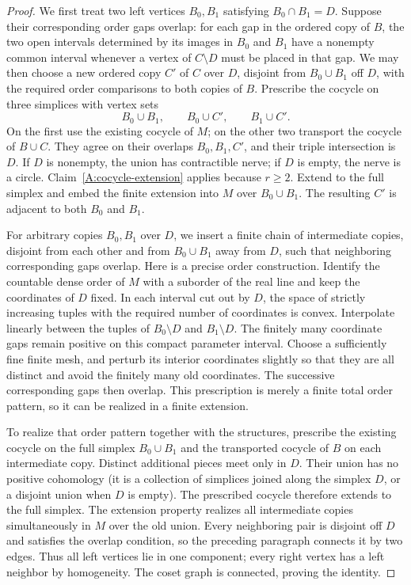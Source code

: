 \begin{proof}
We first treat two left vertices $B_0,B_1$ satisfying $B_0\cap B_1=D$. Suppose their corresponding order gaps overlap: for each gap in the ordered copy of $B$, the two open intervals determined by its images in $B_0$ and $B_1$ have a nonempty common interval whenever a vertex of $C\setminus D$ must be placed in that gap. We may then choose a new ordered copy $C'$ of $C$ over $D$, disjoint from $B_0\cup B_1$ off $D$, with the required order comparisons to both copies of $B$. Prescribe the cocycle on three simplices with vertex sets
\[
 B_0\cup B_1,\qquad B_0\cup C',\qquad B_1\cup C'.
\]
On the first use the existing cocycle of $M$; on the other two transport the cocycle of $B\cup C$. They agree on their overlaps $B_0,B_1,C'$, and their triple intersection is $D$. If $D$ is nonempty, the union has contractible nerve; if $D$ is empty, the nerve is a circle. Claim~\ref{A:cocycle-extension} applies because $r\geq2$. Extend to the full simplex and embed the finite extension into $M$ over $B_0\cup B_1$. The resulting $C'$ is adjacent to both $B_0$ and $B_1$.

For arbitrary copies $B_0,B_1$ over $D$, we insert a finite chain of intermediate copies, disjoint from each other and from $B_0\cup B_1$ away from $D$, such that neighboring corresponding gaps overlap. Here is a precise order construction. Identify the countable dense order of $M$ with a suborder of the real line and keep the coordinates of $D$ fixed. In each interval cut out by $D$, the space of strictly increasing tuples with the required number of coordinates is convex. Interpolate linearly between the tuples of $B_0\setminus D$ and $B_1\setminus D$. The finitely many coordinate gaps remain positive on this compact parameter interval. Choose a sufficiently fine finite mesh, and perturb its interior coordinates slightly so that they are all distinct and avoid the finitely many old coordinates. The successive corresponding gaps then overlap. This prescription is merely a finite total order pattern, so it can be realized in a finite extension.

To realize that order pattern together with the structures, prescribe the existing cocycle on the full simplex $B_0\cup B_1$ and the transported cocycle of $B$ on each intermediate copy. Distinct additional pieces meet only in $D$. Their union has no positive cohomology (it is a collection of simplices joined along the simplex $D$, or a disjoint union when $D$ is empty). The prescribed cocycle therefore extends to the full simplex. The extension property realizes all intermediate copies simultaneously in $M$ over the old union. Every neighboring pair is disjoint off $D$ and satisfies the overlap condition, so the preceding paragraph connects it by two edges. Thus all left vertices lie in one component; every right vertex has a left neighbor by homogeneity. The coset graph is connected, proving the identity.


\end{proof}
